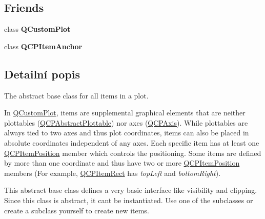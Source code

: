 \subsection*{Friends}
\begin{DoxyCompactItemize}
\item 
\hypertarget{classQCPAbstractItem_a1cdf9df76adcfae45261690aa0ca2198}{}class {\bfseries Q\+Custom\+Plot}\label{classQCPAbstractItem_a1cdf9df76adcfae45261690aa0ca2198}

\item 
\hypertarget{classQCPAbstractItem_a61767d414fd57af9eb1741b34268c7fc}{}class {\bfseries Q\+C\+P\+Item\+Anchor}\label{classQCPAbstractItem_a61767d414fd57af9eb1741b34268c7fc}

\end{DoxyCompactItemize}


\subsection{Detailní popis}
The abstract base class for all items in a plot. 

In \hyperlink{classQCustomPlot}{Q\+Custom\+Plot}, items are supplemental graphical elements that are neither plottables (\hyperlink{classQCPAbstractPlottable}{Q\+C\+P\+Abstract\+Plottable}) nor axes (\hyperlink{classQCPAxis}{Q\+C\+P\+Axis}). While plottables are always tied to two axes and thus plot coordinates, items can also be placed in absolute coordinates independent of any axes. Each specific item has at least one \hyperlink{classQCPItemPosition}{Q\+C\+P\+Item\+Position} member which controls the positioning. Some items are defined by more than one coordinate and thus have two or more \hyperlink{classQCPItemPosition}{Q\+C\+P\+Item\+Position} members (For example, \hyperlink{classQCPItemRect}{Q\+C\+P\+Item\+Rect} has {\itshape top\+Left} and {\itshape bottom\+Right}).

This abstract base class defines a very basic interface like visibility and clipping. Since this class is abstract, it can\textquotesingle{}t be instantiated. Use one of the subclasses or create a subclass yourself to create new items.

